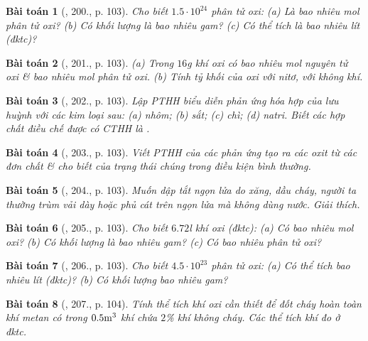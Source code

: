 \documentclass{article}
\newtheorem{baitoan}{Bài toán}
\begin{document}
\begin{baitoan}[\cite{An_400_BT_Hoa_Hoc_8_2020}, 200., p. 103]
	Cho biết $1.5\cdot10^{24}$ phân tử oxi: (a) Là bao nhiêu mol phân tử oxi? (b) Có khối lượng là bao nhiêu gam? (c) Có thể tích là bao nhiêu lít (đktc)?
\end{baitoan}

\begin{baitoan}[\cite{An_400_BT_Hoa_Hoc_8_2020}, 201., p. 103]
	(a) Trong $16$\emph{g} khí oxi có bao nhiêu mol nguyên tử oxi \& bao nhiêu mol phân tử oxi. (b) Tính tỷ khối của oxi với nitơ, với không khí.
\end{baitoan}

\begin{baitoan}[\cite{An_400_BT_Hoa_Hoc_8_2020}, 202., p. 103]
	Lập PTHH biểu diễn phản ứng hóa hợp của lưu huỳnh với các kim loại sau: (a) nhôm; (b) sắt; (c) chì; (d) natri. Biết các hợp chất điều chế được có CTHH là \emph{}.
\end{baitoan}

\begin{baitoan}[\cite{An_400_BT_Hoa_Hoc_8_2020}, 203., p. 103]
	Viết PTHH của các phản ứng tạo ra các oxit \emph{} từ các đơn chất \& cho biết của trạng thái chúng trong điều kiện bình thường.
\end{baitoan}

\begin{baitoan}[\cite{An_400_BT_Hoa_Hoc_8_2020}, 204., p. 103]
	Muốn dập tắt ngọn lửa do xăng, dầu cháy, người ta thường trùm vải dày hoặc phủ cát trên ngọn lửa mà không dùng nước. Giải thích.
\end{baitoan}

\begin{baitoan}[\cite{An_400_BT_Hoa_Hoc_8_2020}, 205., p. 103]
	Cho biết $6.72$\emph{l} khí oxi (đktc): (a) Có bao nhiêu mol oxi? (b) Có khối lượng là bao nhiêu gam? (c) Có bao nhiêu phân tử oxi?
\end{baitoan}

\begin{baitoan}[\cite{An_400_BT_Hoa_Hoc_8_2020}, 206., p. 103]
	Cho biết $4.5\cdot10^{23}$ phân tử oxi: (a) Có thể tích bao nhiêu lít (đktc)? (b) Có khối lượng bao nhiêu gam?
\end{baitoan}

\begin{baitoan}[\cite{An_400_BT_Hoa_Hoc_8_2020}, 207., p. 104]
	Tính thể tích khí oxi cần thiết để đốt cháy hoàn toàn khí metan \emph{} có trong $0.5{\rm m}^3$ khí chứa $2$\% khí không cháy. Các thể tích khí đo ở đktc.
\end{baitoan}
\end{document}
